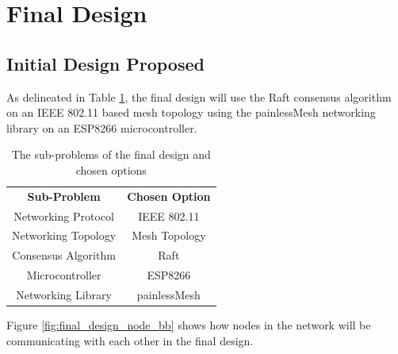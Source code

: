 \section{Final Design}

\subsection{Initial Design Proposed}

As delineated in Table \ref{tab:final_design_chart_options}, the final design will use the Raft consensus algorithm on an IEEE 802.11 based mesh topology using the painlessMesh networking library on an ESP8266 microcontroller.

\begin{table}[H]
    \centering
    \footnotesize
    \renewcommand{\arraystretch}{1.2}
    \vspace{10pt}
    \caption{The sub-problems of the final design and chosen options}
    \label{tab:final_design_chart_options}
    \begin{tabular}{|c|c|}
        \hline
        \textbf{Sub-Problem}   & \textbf{Chosen Option}  \\ 
        \thickhline 
        Networking Protocol    &  IEEE 802.11            \\ \hline
        Networking Topology    &  Mesh Topology          \\ \hline
        Consensus Algorithm    &  Raft                   \\ \hline
        Microcontroller        &  ESP8266                \\ \hline
        Networking Library     &  painlessMesh           \\ \hline
    \end{tabular}
\end{table}

\vspace{-15pt}

Figure \ref{fig:final_design_node_bb} shows how nodes in the network will be communicating with each other in the final design.

